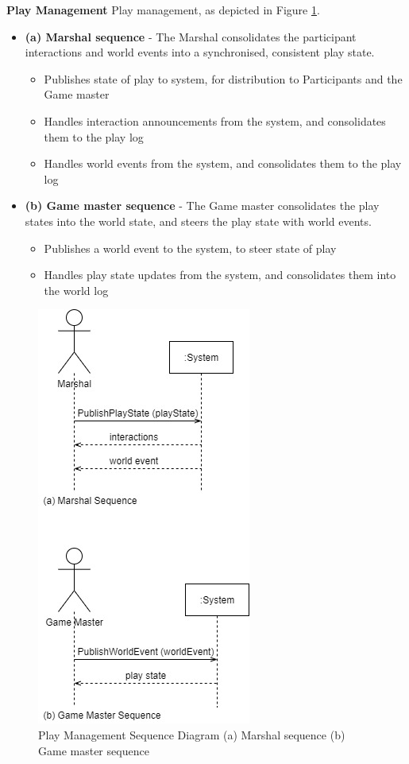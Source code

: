 \textbf{Play Management}
\newline
Play management, as depicted in Figure \ref{fig:PlayManagementSequenceDiagram}.
\begin{itemize}
\item \textbf{(a) Marshal sequence} - The Marshal consolidates the participant interactions and world events into a synchronised, consistent play state.
   \begin{itemize}
     \item Publishes state of play to system, for distribution to Participants and the Game master
     \item Handles interaction announcements from the system, and consolidates them to the play log
     \item Handles world events from the system, and consolidates them to the play log
   \end{itemize}
\item \textbf{(b) Game master sequence} - The Game master consolidates the play states into the world state, and steers the play state with world events.
   \begin{itemize}
     \item Publishes a world event to the system, to steer state of play
     \item Handles play state updates from the system, and consolidates them into the world log
   \end{itemize}
\end{itemize}
\begin{figure}[H]
\centering
\includegraphics[scale=0.5]{images/PlayManagementSequenceDiagram.jpg}
\caption{Play Management Sequence Diagram (a) Marshal sequence (b) Game master sequence}
\label{fig:PlayManagementSequenceDiagram}
\end{figure}

